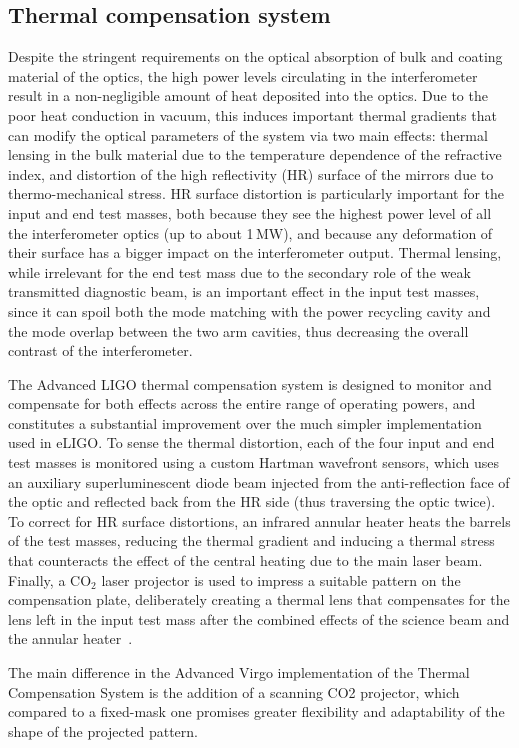 \subsection{Thermal compensation system}
Despite the stringent requirements on the optical absorption of bulk and coating 
material of the optics, the high power levels circulating in the interferometer result 
in a non-negligible amount of heat deposited into the optics.
Due to the poor heat conduction in vacuum, this induces important thermal gradients that can modify 
the optical parameters of the system via two main effects: thermal lensing in the 
bulk material due to the temperature dependence of the refractive index,
and distortion of the high reflectivity (HR) surface of the mirrors due to thermo-mechanical stress.
HR surface distortion is particularly important for the input and end test masses, both because they see the highest power level of all the interferometer optics (up to about 1\,MW), and because any deformation of their surface has a bigger impact on the interferometer output.
Thermal lensing, while irrelevant for the end test mass due to the secondary role of the weak transmitted diagnostic beam, is an important effect in the input test masses, since it can spoil both the mode matching with the power recycling cavity and the mode overlap between the two arm cavities, thus decreasing the overall contrast of the interferometer.

The Advanced LIGO thermal compensation system is designed to monitor and compensate for both effects across the entire range of operating powers, and constitutes a substantial improvement over the much simpler implementation used in eLIGO.
To sense the thermal distortion, each of the four input and end test masses is monitored using a custom Hartman wavefront sensors, which uses an auxiliary superluminescent diode beam injected from the anti-reflection face of the optic and reflected back from the HR side (thus traversing the optic twice).
To correct for HR surface distortions, an infrared annular heater heats the barrels of the test masses, reducing the thermal gradient and inducing a thermal stress that counteracts the effect of the central heating due to the main laser beam.
Finally, a CO$_2$ laser projector is used to impress a suitable pattern on the compensation plate, deliberately creating a thermal lens that compensates for the lens left in the input test mass after the combined effects of the science beam and the annular heater~\cite{TCS_inpreparation}.

The main difference in the Advanced Virgo implementation of the Thermal Compensation System is the addition of a scanning CO2 projector, which compared to a fixed-mask one promises greater flexibility and adaptability of the shape of the projected pattern.


